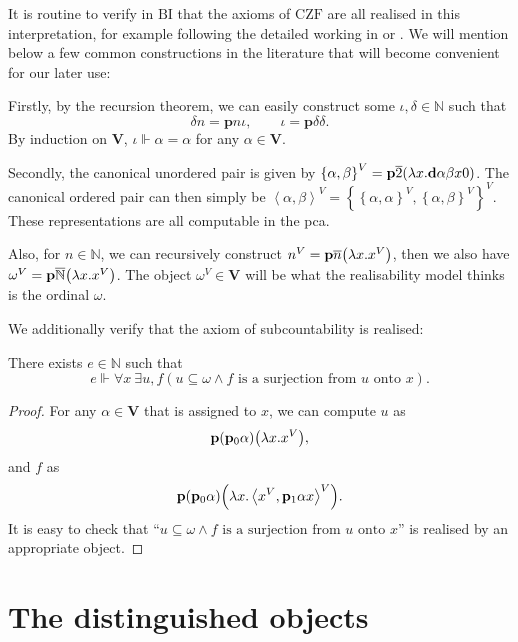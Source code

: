 \documentclass[preprint]{elsarticle}
\theoremstyle{plain}
\newcommand{\tuple}[1]{\left\langle #1 \right\rangle}
\begin{document}
It is routine to verify in $\mathrm{BI}$ that the axioms of $\mathrm{CZF}$ are all realised in this interpretation, for example following the detailed working in \cite{aczel78-type-theoretic-cst} or \cite{rathjen06-formulae-as-classes-interpretation}. We will mention below a few common constructions in the literature that will become convenient for our later use:

Firstly, by the recursion theorem, we can easily construct some $\iota, \delta \in \mathbb{N}$ such that
\[\delta n = \mathbf{p} n \iota, \qquad \iota = \mathbf{p} \delta \delta.\]
By induction on $\mathbf{V}$, $\iota \Vdash \alpha = \alpha$ for any $\alpha \in \mathbf{V}$.

Secondly, the canonical unordered pair is given by $\left\{\alpha, \beta\right\}^V = \mathbf{p}\overline{2}\mleft(\lambda x. \mathbf{d}\alpha\beta x0\mright)$. The canonical ordered pair can then simply be $\tuple{\alpha, \beta}^V = \left\{\left\{\alpha, \alpha\right\}^V, \left\{\alpha, \beta\right\}^V\right\}^V$. These representations are all computable in the pca.

Also, for $n \in \mathbb{N}$, we can recursively construct $n^V = \mathbf{p}\overline{n}\mleft(\lambda x. x^V\mright)$, then we also have $\omega^V = \mathbf{p}\overline{\mathbb{N}}\mleft(\lambda x. x^V\mright)$. The object $\omega^V \in \mathbf{V}$ will be what the realisability model thinks is the ordinal $\omega$.

We additionally verify that the axiom of subcountability is realised:

\begin{proposition}[Subcountability]
  There exists $e \in \mathbb{N}$ such that
  \[e \Vdash \forall x \ \exists u, f \left(u \subseteq \omega \land \text{$f$ is a surjection from $u$ onto $x$}\right).\]
\end{proposition}

\begin{proof}
  For any $\alpha \in \mathbf{V}$ that is assigned to $x$, we can compute $u$ as
  \[\mathbf{p} \mleft(\mathbf{p}_0 \alpha\mright) \mleft(\lambda x. x^V\mright),\]
  and $f$ as
  \[\mathbf{p} \mleft(\mathbf{p}_0 \alpha\mright) \mleft(\lambda x. \tuple{x^V, \mathbf{p}_1 \alpha x}^V\mright).\]
  It is easy to check that ``$u \subseteq \omega \land \text{$f$ is a surjection from $u$ onto $x$}$'' is realised by  an appropriate object.
\end{proof}

\section{The distinguished objects}
\label{sec:dist-ord}
\end{document}
